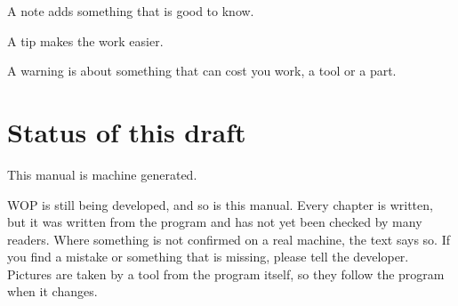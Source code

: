 \begin{notebox}
A note adds something that is good to know.
\end{notebox}
\begin{tipbox}
A tip makes the work easier.
\end{tipbox}
\begin{warningbox}
A warning is about something that can cost you work, a tool or a part.
\end{warningbox}

\section*{Status of this draft}
This manual is machine generated.

WOP is still being developed, and so is this manual. Every chapter is written, but it was written from the program and has not yet been checked by many readers. Where something is not confirmed on a real machine, the text says so. If you find a mistake or something that is missing, please tell the developer. Pictures are taken by a tool from the program itself, so they follow the program when it changes.
